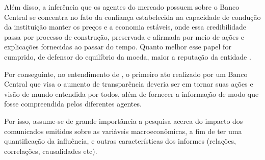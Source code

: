 Além disso, a inferência que os agentes do mercado possuem sobre o Banco Central se concentra no fato da confiança estabelecida na capacidade de condução da instituição manter os preços e a economia estáveis, onde essa credibilidade passa por processo de construção, preservada e afirmada por meio de ações e explicações fornecidas ao passar do tempo. Quanto melhor esse papel for cumprido, de defensor do equilíbrio da moeda, maior a reputação da entidade \cite{issing2002should}.

Por conseguinte, no entendimento de , o primeiro ato realizado por um Banco Central que visa o aumento de transparência deveria ser em tornar suas ações e visão de mundo entendida por todos, além de fornecer a informação de modo que fosse compreendida pelos diferentes agentes.

Por isso, assume-se de grande importância a pesquisa acerca do impacto dos comunicados emitidos sobre as variáveis macroeconômicas, a fim de ter uma quantificação da influência, e outras características dos informes (relações, correlações, causalidades etc).